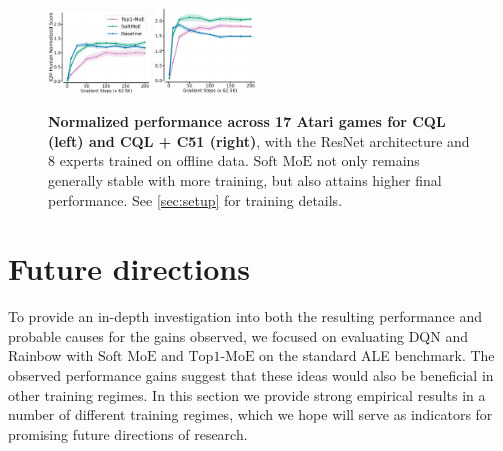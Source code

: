 \documentclass{article}
\theoremstyle{plain}
\theoremstyle{definition}
\theoremstyle{remark}
\newcommand{\moe}{$\textrm{Top1-MoE}$}
\newcommand{\softmoe}{$\textrm{Soft MoE}$}
\begin{document}
\ifarxiv
    \begin{figure}[!t]
        \centering
        \includegraphics[width=0.24\textwidth]{figures/MOEs_offlineCQL_experts_8CORRCOLOR2.pdf}%
        \includegraphics[width=0.24\textwidth]{figures/MOEs_offlineCQL+C51_experts_8CORRCOLOR2.pdf}%
        \vspace{-0.4cm}
        \caption{\textbf{Normalized performance across 17 Atari games for CQL (left) and CQL + C51 (right)}, with the ResNet \citep{espeholt2018impala} architecture and 8 experts trained on offline data. \softmoe{} not only remains generally stable with more training, but also attains higher final performance. See \cref{sec:setup} for training details.}
        \label{fig:offline_rlMOEs}
        \vspace{-0.2cm}
    \end{figure}
\fi

\section{Future directions}
\label{sec:futureDirections}
To provide an in-depth investigation into both the resulting performance and probable causes for the gains observed, we focused on evaluating DQN and Rainbow  with \softmoe{} and \moe{} on the standard ALE benchmark. The observed performance gains suggest that these ideas would also be beneficial in other training regimes. In this section we provide strong empirical results in a number of different training regimes, which we hope will serve as indicators for promising future directions of research.
\end{document}
